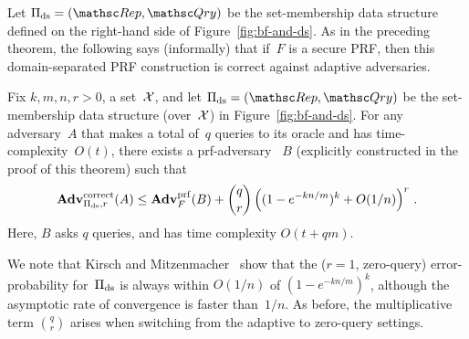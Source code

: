  Let $\setprim_{\mathrm{ds}}= (\Rep, \Qry)$
be the set-membership data structure defined on the right-hand side
of Figure~\ref{fig:bf-and-ds}. As in the preceding theorem, the
following says (informally) that if~$F$ is a secure PRF, then this
domain-separated PRF construction is correct against adaptive
adversaries.


\begin{theorem}\label{thm2}\label{thm:ds-correctness}
Fix $k,m,n,r>0$, a set~${\cal X}$, and let $\setprim_{\mathrm{ds}}= (\Rep, \Qry)$ be the set-membership data structure (over~${\cal X}$) in Figure~\ref{fig:bf-and-ds}.  For any adversary~$A$ that makes a total of~$q$ queries to its oracle and has time-complexity~$O(t)$, there exists a prf-adversary ~$B$ (explicitly constructed in the proof of this theorem) such that
\[
\mathrm{\mathbf{Adv}}^{\mathrm{correct}}_{\Pi_{\mathrm{ds}},r}(A) \leq  \mathbf{Adv}^{\mathrm{prf}}_{F}(B)  + {\dbinom{q}{r}} \left( (1-e^{-kn/m})^k + O(1/n) \right)^r\,.
\]
Here, $B$ asks $q$ queries, and has time complexity $O(t+qm)$.
\end{theorem}
We note that Kirsch and Mitzenmacher~\cite{kirsch2006less} show
that the ($r=1$, zero-query) error-probability for~$\Pi_\mathrm{ds}$ is
always within $O(1/n)$ of $(1-e^{-kn/m})^k$, although the asymptotic
rate of convergence is faster than~$1/n$.   As before, the multiplicative term $\binom{q}{r}$ arises when switching from the adaptive to zero-query settings.



